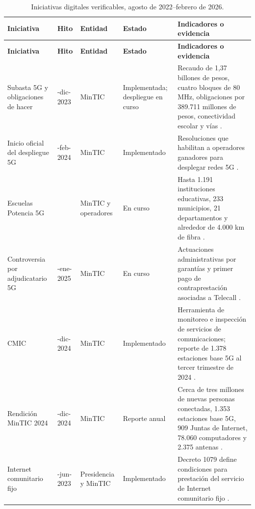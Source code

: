 
\footnotesize
\begin{longtable}{>{\raggedright\arraybackslash}p{}>{\raggedright\arraybackslash}p{}>{\raggedright\arraybackslash}p{}>{\raggedright\arraybackslash}p{}>{\raggedright\arraybackslash}p{}}
\caption{Iniciativas digitales verificables, agosto de 2022--febrero de 2026.}\label{tab:inventario}\\
\toprule
\textbf{Iniciativa} & \textbf{Hito} & \textbf{Entidad} & \textbf{Estado} & \textbf{Indicadores o evidencia} \\
\midrule
\endfirsthead
\toprule
\textbf{Iniciativa} & \textbf{Hito} & \textbf{Entidad} & \textbf{Estado} & \textbf{Indicadores o evidencia} \\
\midrule
\endhead
Subasta 5G y obligaciones de hacer & 20-dic-2023 & MinTIC & Implementada; despliegue en curso & Recaudo de 1,37 billones de pesos, cuatro bloques de 80 MHz, obligaciones por 389.711 millones de pesos, conectividad escolar y vías \parencite{mintic_5g_realidad_2023}. \\
Inicio oficial del despliegue 5G & 23-feb-2024 & MinTIC & Implementado & Resoluciones que habilitan a operadores ganadores para desplegar redes 5G \parencite{mintic_despliegue_5g_2024}. \\
Escuelas Potencia 5G & 2024 & MinTIC y operadores & En curso & Hasta 1.191 instituciones educativas, 233 municipios, 21 departamentos y alrededor de 4.000 km de fibra \parencite{mintic_escuelas_potencia_5g_2024}. \\
Controversia por adjudicatario 5G & 29-ene-2025 & MinTIC & En curso & Actuaciones administrativas por garantías y primer pago de contraprestación asociadas a Telecall \parencite{mintic_telecall_espectro_5g_2025,lorduy_telecall_conciliacion_2026}. \\
CMIC & 20-dic-2024 & MinTIC & Implementado & Herramienta de monitoreo e inspección de servicios de comunicaciones; reporte de 1.378 estaciones base 5G al tercer trimestre de 2024 \parencite{mintic_cmic_telecomunicaciones_2024}. \\
Rendición MinTIC 2024 & 09-dic-2024 & MinTIC & Reporte anual & Cerca de tres millones de nuevas personas conectadas, 1.353 estaciones base 5G, 909 Juntas de Internet, 78.060 computadores y 2.375 antenas \parencite{mintic_rendicion_cuentas_2024}. \\
Internet comunitario fijo & 30-jun-2023 & Presidencia y MinTIC & Implementado & Decreto 1079 define condiciones para prestación del servicio de Internet comunitario fijo \parencite{funcionpublica_decreto_1079_2023}. \\

\end{longtable}
